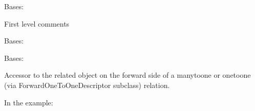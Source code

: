 \documentclass[letterpaper,10pt,english]{sphinxmanual}
\begin{document}
\begin{fulllineitems}
\label{\detokenize{forums:forums.models.Comment1}}
Bases: {\hyperref[\detokenize{forums:forums.models.AbstractForum}]{}}

First level comments

\begin{fulllineitems}
\label{\detokenize{forums:forums.models.Comment1.DoesNotExist}}
Bases: 

\end{fulllineitems}


\begin{fulllineitems}
\label{\detokenize{forums:forums.models.Comment1.MultipleObjectsReturned}}
Bases: 

\end{fulllineitems}


\begin{fulllineitems}
\label{\detokenize{forums:forums.models.Comment1.author}}
Accessor to the related object on the forward side of a many\sphinxhyphen{}to\sphinxhyphen{}one or
one\sphinxhyphen{}to\sphinxhyphen{}one (via ForwardOneToOneDescriptor subclass) relation.

In the example:

\begin{sphinxVerbatim}[commandchars=\\\{\}]
 
       
\end{sphinxVerbatim}


\end{fulllineitems}
\end{fulllineitems}
\end{document}
